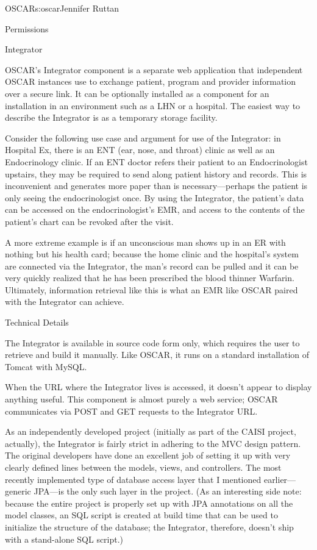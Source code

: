 \begin{aosachapter}{OSCAR}{s:oscar}{Jennifer Ruttan}
\begin{aosasect1}{Permissions}
\end{aosasect1}

\begin{aosasect1}{Integrator}

OSCAR's Integrator component is a separate web application that
independent OSCAR instances use to exchange patient, program and
provider information over a secure link. It can be optionally
installed as a component for an installation in an environment such as
a LHN or a hospital. The easiest way to describe the Integrator is as
a temporary storage facility.

Consider the following use case and argument for use of the
Integrator: in Hospital Ex, there is an ENT (ear, nose, and throat)
clinic as well as an Endocrinology clinic. If an ENT doctor refers
their patient to an Endocrinologist upstairs, they may be required to
send along patient history and records. This is inconvenient and
generates more paper than is necessary---perhaps the patient is only
seeing the endocrinologist once. By using the Integrator, the
patient's data can be accessed on the endocrinologist's EMR, and
access to the contents of the patient's chart can be revoked after the
visit.

A more extreme example is if an unconscious man shows up in an ER with
nothing but his health card; because the home clinic and the
hospital's system are connected via the Integrator, the man's record
can be pulled and it can be very quickly realized that he has been
prescribed the blood thinner Warfarin. Ultimately, information
retrieval like this is what an EMR like OSCAR paired with the
Integrator can achieve.

\begin{aosasect2}{Technical Details}

The Integrator is available in source code form only, which requires
the user to retrieve and build it manually. Like OSCAR, it runs on a
standard installation of Tomcat with MySQL.

When the URL where the Integrator lives is accessed, it doesn't appear
to display anything useful. This component is almost purely a web
service; OSCAR communicates via POST and GET requests to the
Integrator URL.

As an independently developed project (initially as part of the CAISI
project, actually), the Integrator is fairly strict in adhering to the
MVC design pattern. The original developers have done an excellent job
of setting it up with very clearly defined lines between the models,
views, and controllers. The most recently implemented type of database
access layer that I mentioned earlier---generic JPA---is the only such
layer in the project. (As an interesting side note: because the entire
project is properly set up with JPA annotations on all the model
classes, an SQL script is created at build time that can be used to
initialize the structure of the database; the Integrator, therefore,
doesn't ship with a stand-alone SQL script.)


\end{aosasect2}
\end{aosasect1}
\end{aosachapter}
